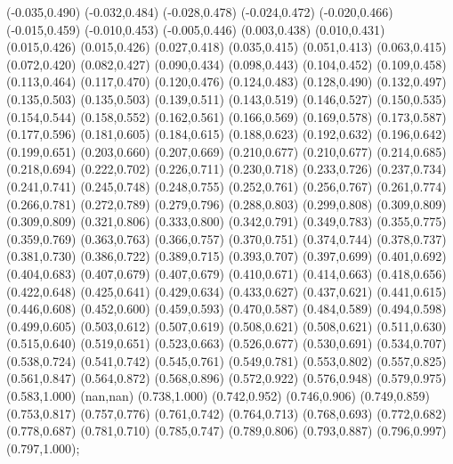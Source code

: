 {{		(-0.035,0.490) (-0.032,0.484) (-0.028,0.478) (-0.024,0.472) (-0.020,0.466) (-0.015,0.459)
		(-0.010,0.453) (-0.005,0.446) (0.003,0.438) (0.010,0.431) (0.015,0.426) (0.015,0.426)
		(0.027,0.418) (0.035,0.415) (0.051,0.413) (0.063,0.415) (0.072,0.420) (0.082,0.427)
		(0.090,0.434) (0.098,0.443) (0.104,0.452) (0.109,0.458) (0.113,0.464) (0.117,0.470)
		(0.120,0.476) (0.124,0.483) (0.128,0.490) (0.132,0.497) (0.135,0.503) (0.135,0.503)
		(0.139,0.511) (0.143,0.519) (0.146,0.527) (0.150,0.535) (0.154,0.544) (0.158,0.552)
		(0.162,0.561) (0.166,0.569) (0.169,0.578) (0.173,0.587) (0.177,0.596) (0.181,0.605)
		(0.184,0.615) (0.188,0.623) (0.192,0.632) (0.196,0.642) (0.199,0.651) (0.203,0.660)
		(0.207,0.669) (0.210,0.677) (0.210,0.677) (0.214,0.685) (0.218,0.694) (0.222,0.702)
		(0.226,0.711) (0.230,0.718) (0.233,0.726) (0.237,0.734) (0.241,0.741) (0.245,0.748)
		(0.248,0.755) (0.252,0.761) (0.256,0.767) (0.261,0.774) (0.266,0.781) (0.272,0.789)
		(0.279,0.796) (0.288,0.803) (0.299,0.808) (0.309,0.809) (0.309,0.809) (0.321,0.806)
		(0.333,0.800) (0.342,0.791) (0.349,0.783) (0.355,0.775) (0.359,0.769) (0.363,0.763)
		(0.366,0.757) (0.370,0.751) (0.374,0.744) (0.378,0.737) (0.381,0.730) (0.386,0.722)
		(0.389,0.715) (0.393,0.707) (0.397,0.699) (0.401,0.692) (0.404,0.683) (0.407,0.679)
		(0.407,0.679) (0.410,0.671) (0.414,0.663) (0.418,0.656) (0.422,0.648) (0.425,0.641)
		(0.429,0.634) (0.433,0.627) (0.437,0.621) (0.441,0.615) (0.446,0.608) (0.452,0.600)
		(0.459,0.593) (0.470,0.587) (0.484,0.589) (0.494,0.598) (0.499,0.605) (0.503,0.612)
		(0.507,0.619) (0.508,0.621) (0.508,0.621) (0.511,0.630) (0.515,0.640) (0.519,0.651)
		(0.523,0.663) (0.526,0.677) (0.530,0.691) (0.534,0.707) (0.538,0.724) (0.541,0.742)
		(0.545,0.761) (0.549,0.781) (0.553,0.802) (0.557,0.825) (0.561,0.847) (0.564,0.872)
		(0.568,0.896) (0.572,0.922) (0.576,0.948) (0.579,0.975) (0.583,1.000) (nan,nan)
		(0.738,1.000) (0.742,0.952) (0.746,0.906) (0.749,0.859) (0.753,0.817) (0.757,0.776)
		(0.761,0.742) (0.764,0.713) (0.768,0.693) (0.772,0.682) (0.778,0.687) (0.781,0.710)
		(0.785,0.747) (0.789,0.806) (0.793,0.887) (0.796,0.997) (0.797,1.000)};}
